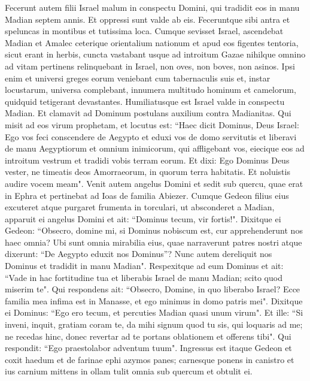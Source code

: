 \begin{biblechapter}  
\verse Fecerunt autem filii Israel malum in conspectu Domini, qui tradidit eos in manu Madian septem annis. 
\verse Et oppressi sunt valde ab eis. Feceruntque sibi antra et speluncas in montibus et tutissima loca. 
\verse Cumque sevisset Israel, ascendebat Madian et Amalec ceterique orientalium nationum 
\verse et apud eos figentes tentoria, sicut erant in herbis, cuncta vastabant usque ad introitum Gazae nihilque omnino ad vitam pertinens relinquebant in Israel, non oves, non boves, non asinos. 
\verse Ipsi enim et universi greges eorum veniebant cum tabernaculis suis et, instar locustarum, universa complebant, innumera multitudo hominum et camelorum, quidquid tetigerant devastantes. 
\verse Humiliatusque est Israel valde in conspectu Madian. 
\verse Et clamavit ad Dominum postulans auxilium contra Madianitas. 
\verse Qui misit ad eos virum prophetam, et locutus est: “Haec dicit Dominus, Deus Israel: Ego vos feci conscendere de Aegypto et eduxi vos de domo servitutis 
\verse et liberavi de manu Aegyptiorum et omnium inimicorum, qui affligebant vos, eiecique eos ad introitum vestrum et tradidi vobis terram eorum. 
\verse Et dixi: Ego Dominus Deus vester, ne timeatis deos Amorraeorum, in quorum terra habitatis. Et noluistis audire vocem meam". 
\verse Venit autem angelus Domini et sedit sub quercu, quae erat in Ephra et pertinebat ad Ioas de familia Abiezer. Cumque Gedeon filius eius excuteret atque purgaret frumenta in torculari, ut absconderet a Madian, 
\verse apparuit ei angelus Domini et ait: “Dominus tecum, vir fortis!". 
\verse Dixitque ei Gedeon: “Obsecro, domine mi, si Dominus nobiscum est, cur apprehenderunt nos haec omnia? Ubi sunt omnia mirabilia eius, quae narraverunt patres nostri atque dixerunt: “De Aegypto eduxit nos Dominus”? Nunc autem dereliquit nos Dominus et tradidit in manu Madian". 
\verse Respexitque ad eum Dominus et ait: “Vade in hac fortitudine tua et liberabis Israel de manu Madian; scito quod miserim te".  
\verse Qui respondens ait: “Obsecro, Domine, in quo liberabo Israel? Ecce familia mea infima est in Manasse, et ego minimus in domo patris mei". 
\verse Dixitque ei Dominus: “Ego ero tecum, et percuties Madian quasi unum virum". 
\verse Et ille: “Si inveni, inquit, gratiam coram te, da mihi signum quod tu sis, qui loquaris ad me; 
\verse ne recedas hinc, donec revertar ad te portans oblationem et offerens tibi". Qui respondit: “Ego praestolabor adventum tuum". 
\verse Ingressus est itaque Gedeon et coxit haedum et de farinae ephi azymos panes; carnesque ponens in canistro et ius carnium mittens in ollam tulit omnia sub quercum et obtulit ei. 

\end{biblechapter}
